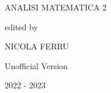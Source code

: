 \begin{titlepage}
\begin{center}
		\Huge \doublespacing \bfseries \begin{spacing}{1}{ANALISI MATEMATICA 2}\end{spacing}
		\hfill
		\normalsize \itshape \begin{spacing}{1}{}\end{spacing}
		\hfill
		\normalsize\itshape \begin{spacing}{1}{edited by}\end{spacing}
		\hfill
		\Large\itshape  \begin{spacing}{1}{NICOLA FERRU}\end{spacing}
		\vspace{0.5cm}
		
		\hfill
		\vfill
		\Large \bfseries \begin{spacing}{1}{Unofficial Version}\end{spacing}
		\vspace{0.5cm}
		{\small 2022 -  2023}
	\end{center}
	\clearpage
	\thispagestyle{empty}
	\vspace*{\fill}%
	{\par}%
	\vspace{\fill}
\end{titlepage}